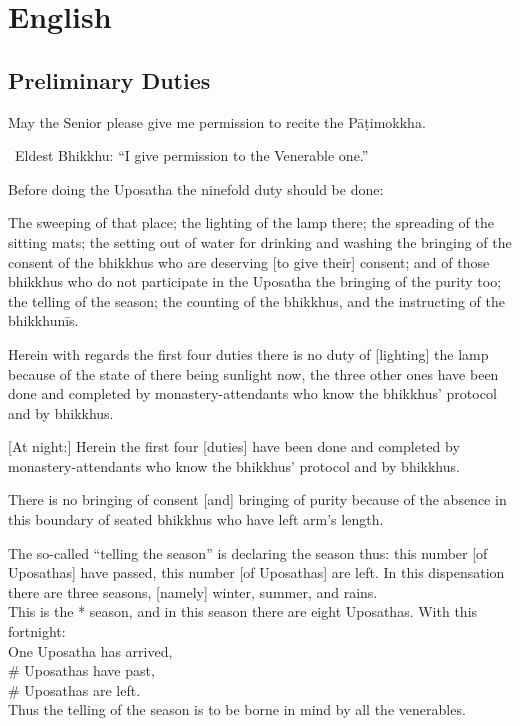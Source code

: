 
\chapter{English}

\clearpage

\section{Preliminary Duties}
\label{preliminary-duties}

\begin{center}
  May the Senior please give me permission to recite the Pāṭimokkha.
\end{center}

\begin{center}
  \anglebracketleft\ \hspace{-0.5mm}Eldest Bhikkhu: ``I give permission to the Venerable one.'' \hspace{-0.5mm}\anglebracketright\
\end{center}

Before doing the Uposatha the ninefold duty should be done:

The sweeping of that place; the lighting of the lamp there; the spreading of the sitting mats; the setting out of water for drinking and washing the bringing of the consent of the bhikkhus who are deserving [to give their] consent; and of those bhikkhus who do not participate in the Uposatha the bringing of the purity too; the telling of the season; the counting of the bhikkhus, and the instructing of the bhikkhunīs.

Herein with regards the first four duties there is no duty of [lighting] the lamp because of the state of there being sunlight now, the three other ones have been done and completed by monastery-attendants who know the bhikkhus' protocol and by bhikkhus.

[At night:] Herein the first four [duties] have been done and completed by monastery-attendants who know the bhikkhus’ protocol and by bhikkhus.

There is no bringing of consent [and] bringing of purity because of the absence in this boundary of seated bhikkhus who have left arm's length.

The so-called ``telling the season'' is declaring the season thus: this number [of Uposathas] have passed, this number [of Uposathas] are left. In this dispensation there are three seasons, [namely] winter, summer, and rains.\\
This is the * season, and in this season there are eight Uposathas. With this fortnight:\\
One Uposatha has arrived,\\
\# Uposathas have past,\\
\# Uposathas are left.\\
Thus the telling of the season is to be borne in mind by all the venerables.

